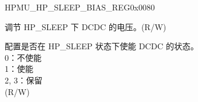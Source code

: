 \begin{register}{H}{PMU\_HP\_SLEEP\_BIAS\_REG}{0x0080}\label{regdesc:PMUHPSLEEPBIASREG}
%
%
%
%
\regnewline%
\begin{regdesc}\begin{reglist}
\label{fielddesc:PMUHPSLEEPDCMVSET}\item [PMU\_HP\_SLEEP\_DCM\_VSET]  调节 HP\_SLEEP 下 DCDC 的电压。(R/W) \\
\label{fielddesc:PMUHPSLEEPDCMMODE}\item [PMU\_HP\_SLEEP\_DCM\_MODE] 配置是否在 HP\_SLEEP 状态下使能 DCDC 的状态。\\
0：不使能 \\
1：使能 \\
2, 3：保留\\
(R/W)
\end{reglist}\end{regdesc}
\end{register}


